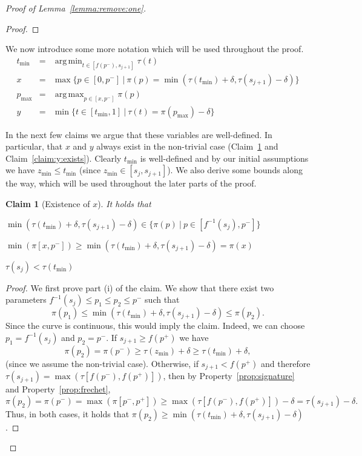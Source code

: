 \documentclass[11pt, letter]{article}
\DeclareMathOperator*{\argmin}{arg\,min}
\DeclareMathOperator*{\argmax}{arg\,max}
\newtheorem{claim}[theorem]{Claim}
\newcommand{\lemref}[1]{Lemma~\ref{lemma:#1}}
\newcommand{\claimlab}[1]{\label{claim:#1}}
\newcommand{\claimref}[1]{Claim~\ref{claim:#1}}
\newcommand{\propref}[1]{Property~\ref{prop:#1}}
\providecommand{\pth}[2][\!]{#1\left({#2}\right)}
\newcommand{\minSubC}[4]{\ensuremath{\min( #1[#3,#4])}}
\newcommand{\maxSubC}[4]{\ensuremath{\max( #1[#3,#4])}}
\begin{document}
\begin{proof}[Proof of \lemref{remove:one}]
\begin{proof}
\end{proof}




We now introduce some more notation which will be used throughout the proof.
\begin{eqnarray*} 
t_{\min} &=& \argmin_{t \in [f(p^{-}),s_{j+1}] } \tau(t)\\
x &=& \max\{p \in [0,p^{-}] ~|~ \pi(p) = \min(\tau(t_{\min}) + \delta,
\tau(s_{j+1}) - \delta)\}\\
p_{\max}&=& \argmax_{p \in [x, p^{-}] } \pi(p)\\
y &=& \min\{t \in [t_{\min}, 1] ~|~ \tau(t) = \pi(p_{\max}) - \delta\}
\end{eqnarray*}

In the next few claims we argue that these variables are well-defined. In
particular, that $x$ and $y$ always exist in the non-trivial case
(\claimref{x:exists} and \claimref{y:exists}).  Clearly $t_{\min}$ is
well-defined and by our initial assumptions we have $z_{\min} \leq t_{\min}$
(since $z_{\min} \in [s_j,s_{j+1}]$). We also derive some bounds along the way,
which will be used throughout the later parts of the proof.

\begin{claim}[Existence of $x$]
It holds that
\begin{compactenum}[(i)]
\item $\min(\tau(t_{\min}) + \delta, \tau(s_{j+1})-\delta) \in \{\pi(p) ~|~ p
\in [f^{-1}(s_j),p^{-}]\}$
\item $\minSubC{\pi}{p}{x}{p^{-}} \geq \min(\tau(t_{\min}) + \delta, \tau(s_{j+1})-\delta) = \pi(x)$
\item $\tau(s_j) < \tau(t_{\min})$
\end{compactenum}
\claimlab{x:exists}
\claimlab{x:high}
\claimlab{sj:low}
\end{claim}
\begin{proof}
We first prove part (i) of the claim.
We show that there exist two parameters
$f^{-1}(s_j) \leq p_1 \leq  p_2 \leq p^{-}$ such that 
\[\pi(p_1) \leq \min\pth{\tau(t_{\min})+\delta, \tau(s_{j+1})-\delta} \leq \pi(p_2).\]
Since the curve is continuous, this would imply the claim.
Indeed, we can choose $p_1=f^{-1}(s_j)$ and  $p_2=p^{-}$.
If $s_{j+1}\geq f(p^{+})$ we have 
\begin{equation*}
\pi(p_2)=\pi(p^{-}) \geq \tau(z_{\min}) + \delta \geq \tau(t_{\min}) + \delta, 
\end{equation*}
(since we assume the non-trivial case). 
Otherwise, if  $s_{j+1} < f(p^{+})$ and therefore $\tau(s_{j+1})=\maxSubC{\tau}{t}{f(p^{-})}{f(p^{+})}$, then by \propref{signature} and
\propref{frechet},
\[\pi(p_2)=\pi(p^{-}) = \maxSubC{\pi}{p}{p^{-}}{p^{+}} \geq
\maxSubC{\tau}{t}{f(p^{-})}{f(p^{+})} - \delta = \tau(s_{j+1}) -\delta. \]
Thus, in both cases, it holds that 
$\pi(p_2) \geq \min\pth{\tau(t_{\min})+\delta, \tau(s_{j+1})-\delta}$.


\end{proof}
\end{proof}
\end{document}
